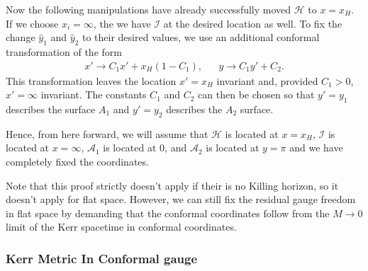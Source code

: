 \documentclass[aps,prd,amsmath,showpacs,amssymb,superscriptaddress,nofootinbib,longbibliography,eqsecnum,preprintnumbers]{revtex4-1}
\newcommand{\zach}[1]{\textcolor{ForestGreen}{#1}}
\begin{document}
Now the following manipulations have already successfully moved $\mathcal H$ to $x=x_H$. If we choose $x_i=\infty$, the we have $\mathcal{I}$ at the desired location as well.
To fix the change $\hat y_1$ and $\hat y_2$ to their desired values, we use an additional conformal transformation of the form
\begin{align}
&x'\to C_1 x'+x_H(1-C_1),& &y\to C_1 y' +C_2.&
\end{align}
This transformation leaves the location $x'=x_H$ invariant and, provided $C_1>0$, $x'=\infty$ invariant. The constants $C_1$ and $C_2$ can then be chosen so that $y'=y_1$ describes the surface $A_1$ and $y'=y_2$ describes the $A_2$ surface.

Hence, from here forward, we will assume that $\mathcal{H}$ is located at $x=x_H$, $\mathcal{I}$ is located at $x=\infty$, $\mathcal{A}_1$ is located at $0$, and $\mathcal{A}_2$ is located at $y=\pi$ and we have completely fixed the coordinates.

Note that this proof strictly doesn't apply if their is no Killing horizon, so it doesn't apply for flat space. However, we can still fix the residual gauge freedom in flat space by demanding that the conformal coordinates follow from the $M\to 0$ limit of the Kerr spacetime in conformal coordinates.

%
%

\subsubsection{Kerr Metric In Conformal gauge}
\end{document}
